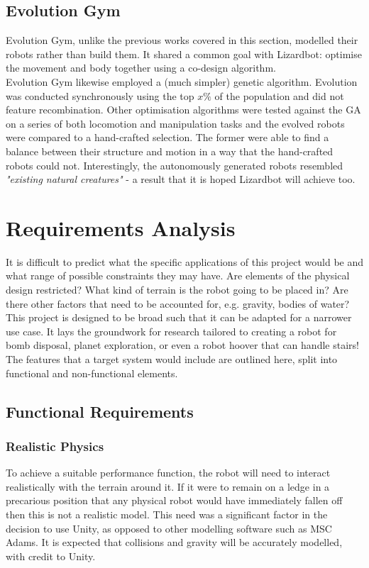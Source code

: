 \documentclass{article}
\begin{document}
\subsection{Evolution Gym}
\label{sec:Evolution Gym}
Evolution Gym,  unlike the previous works covered in this section, modelled their robots rather than build them. It shared a common goal with Lizardbot: optimise the movement and body together using a co-design algorithm. \\
Evolution Gym likewise employed a (much simpler) genetic algorithm. Evolution was conducted synchronously using the top $x\%$ of the population and did not feature recombination. Other optimisation algorithms were tested against the GA on a series of both locomotion and manipulation tasks and the evolved robots were compared to a hand-crafted selection. The former were able to find a balance between their structure and motion in a way that the hand-crafted robots could not. Interestingly, the autonomously generated robots resembled \textit{"existing natural creatures"} - a result that it is hoped Lizardbot will achieve too.

\newpage
\section{Requirements Analysis}
\label{sec:Requirements Analysis}
It is difficult to predict what the specific applications of this project would be and what range of possible constraints they may have. Are elements of the physical design restricted? What kind of terrain is the robot going to be placed in? Are there other factors that need to be accounted for, e.g. gravity, bodies of water? This project is designed to be broad such that it can be adapted for a narrower use case. It lays the groundwork for research tailored to creating a robot for bomb disposal, planet exploration, or even a robot hoover that can handle stairs!
The features that a target system would include are outlined here, split into functional and non-functional elements.

\subsection{Functional Requirements}
\label{sec:Functional Requirements}
\subsubsection{Realistic Physics}
\label{sec:Realistic Physics}
To achieve a suitable performance function, the robot will need to interact realistically with the terrain around it. If it were to remain on a ledge in a precarious position that any physical robot would have immediately fallen off then this is not a realistic model. 
This need was a significant factor in the decision to use Unity, as opposed to other modelling software such as MSC Adams.  It is expected that collisions and gravity will be accurately modelled, with credit to Unity.
\end{document}
